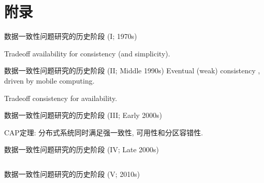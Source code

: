 \section{附录}

\begin{frame}{数据一致性问题研究的历史阶段 (I; 1970s)}

  \begin{center}
	Tradeoff availability for consistency {\scriptsize (and simplicity)}.
  \end{center}
\end{frame}
\begin{frame}{数据一致性问题研究的历史阶段 (II; Middle 1990s)}
  Eventual {\scriptsize (weak)} consistency ,  driven by mobile computing.
  

  \begin{center}
	Tradeoff consistency for availability.
  \end{center}
\end{frame}
\begin{frame}{数据一致性问题研究的历史阶段 (III; Early 2000s)}

  CAP定理: 分布式系统同时满足强一致性, 可用性和分区容错性.
   
\end{frame}
\begin{frame}{数据一致性问题研究的历史阶段 (IV; Late 2000s)}

  \begin{columns}
  \end{columns}
\end{frame}
\begin{frame}{数据一致性问题研究的历史阶段 (V; 2010s)}
\end{frame}
